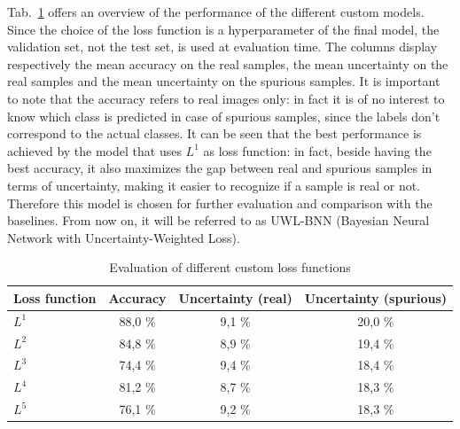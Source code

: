 \documentclass[11pt,twoside,a4paper]{article}
\begin{document}
Tab.~\ref{tab:custom} offers an overview of the performance of the different custom models. Since the choice of the loss function is a hyperparameter of the final model, the validation set, not the test set, is used at evaluation time. The columns display respectively the mean accuracy on the real samples, the mean uncertainty on the real samples and the mean uncertainty on the spurious samples.
It is important to note that the accuracy refers to real images only: in fact it is of no interest to know which class is predicted in case of spurious samples, since the labels don't correspond to the actual classes.\newline
It can be seen that the best performance is achieved by the model that uses \(L^1\) as loss function: in fact, beside having the best accuracy, it also maximizes the gap between real and spurious samples in terms of uncertainty, making it easier to recognize if a sample is real or not. Therefore this model is chosen for further evaluation and comparison with the baselines. From now on, it will be referred to as UWL-BNN (Bayesian Neural Network with Uncertainty-Weighted Loss).

\begin{table}[!b]
  \begin{adjustwidth}{-.5in}{-.5in}
  \begin{center}
    \begin{tabular}{l | c | c | c}
      Loss function	& Accuracy	& Uncertainty (real)	& Uncertainty (spurious) \\
      \hline
      \(L^1\)		& 88,0 \%		& 9,1  \% 			& 20,0 \% \\      
      \(L^2\)		& 84,8 \%		& 8,9 \% 			& 19,4 \% \\      
      \(L^3\)		& 74,4 \%		& 9,4 \% 			& 18,4 \% \\      
      \(L^4\)		& 81,2 \%		& 8,7 \% 			& 18,3 \% \\      
      \(L^5\)		& 76,1 \%		& 9,2 \% 			& 18,3 \% \\      
    \end{tabular}
    \caption{Evaluation of different custom loss functions}
    \label{tab:custom}
  \end{center}
  \end{adjustwidth}
\end{table}
\end{document}
